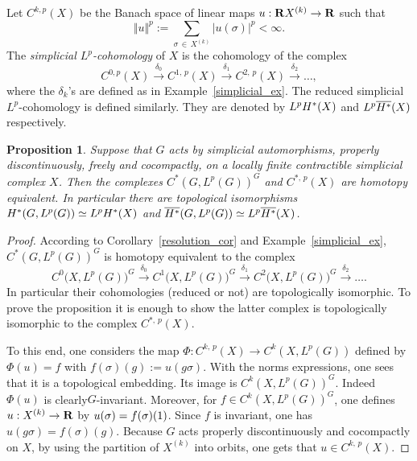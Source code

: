 \documentclass[11pt]{article}
\newtheorem{prop}[theo]{Proposition}
\theoremstyle{definition}
\numberwithin{equation}{section}
\numberwithin{figure}{section}
\numberwithin{table}{section}
\begin{document}
Let $C^{k,p}(X)$ be the Banach space of linear maps $u: {\bf R} X^{(k)} \to {\bf R}$ such that
\[
\Vert u \Vert^p := \sum _{\sigma\,\in\, X^{(k)}} \vert u(\sigma) \vert^p < \infty.
\]
The \emph{simplicial $L^p$-cohomology} of $X$ is the cohomology of the complex
\[
C^{0,p}(X) \stackrel{\delta _0}{\to} C^{1,\,p}(X) \stackrel{\delta _1}{\to} C^{2,\,p}(X) \stackrel{\delta _2}{\to}\dots,
\]
where the $\delta_k$'s are defined as in Example~\ref{simplicial_ex}. The reduced simplicial $L^p$-cohomology is defined similarly. They are denoted by $L^p {\rm H}^*(X)$ and $L^p\overline{{\rm H}^*} (X)$ respectively.


\begin{prop}\label{simplicial_prop}
Suppose that $G$ acts by simplicial automorphisms, properly discontinuously, freely and cocompactly, on a locally finite contractible simplicial complex $X$. Then the complexes $C^*(G,L^p(G))^G$ and $C^{*,\,p}(X)$ are homotopy equivalent. In particular there are topological isomorphisms ${\rm H}^* (G, L^p(G) ) \simeq L^p{\rm H}^* (X)$ and $\overline{{\rm H}^*} (G, L^p(G)) \simeq L^p\overline{{\rm H}^*} (X)$.
\end{prop}

\begin{proof}
According to Corollary~\ref{resolution_cor} and Example~\ref{simplicial_ex}, $C^*(G,L^p(G))^G$ is homotopy equivalent to the complex
\[
C^0\bigl(X,L^p(G)\bigr)^G \stackrel{\delta_0}{\to} C^1\bigl(X,L^p(G)\bigr)^G \stackrel{\delta_1}{\to} C^2\bigl(X,L^p(G)\bigr)^G \stackrel{\delta_2}{\to}\dots.
\]
In particular their cohomologies (reduced or not) are topologically isomorphic. To prove the proposition it is enough to show the latter complex is topologically isomorphic to the complex $C^{*,\,p}(X)$.

To this end, one considers the map $\Phi: C^{k,\,p}(X) \to C^k(X,L^p(G))$ defined by $\Phi (u) = f$ with $f(\sigma)(g):= u(g\sigma)$. With the norms expressions, one sees that it is a topological embedding. Its image is $C^k(X,L^p(G))^G$. Indeed $\Phi (u)$ is clearly\linebreak$G$-invariant. Moreover, for $f \in C^k(X,L^p(G))^G$, one defines $u: X^{(k)} \to {\bf R}$ by $u(\sigma)\linebreak= f(\sigma)(1)$. Since $f$ is invariant, one has $u (g \sigma) = f(\sigma)(g)$. Because $G$ acts properly discontinuously and cocompactly on $X$, by using the partition of $X^{(k)}$ into orbits, one gets that $u \in C^{k,\,p}(X)$.
\end{proof}
\end{document}

